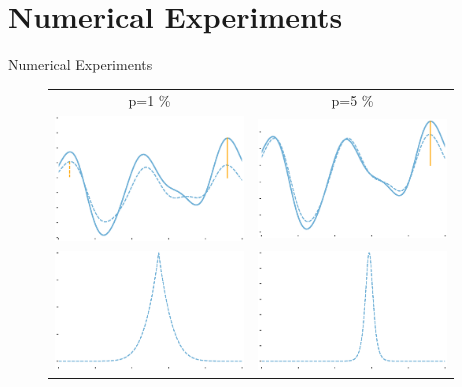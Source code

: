 \documentclass{beamer}
\begin{document}
\section{Numerical Experiments}
\begin{frame}{Numerical Experiments}
	\begin{figure}[H]
		\centering
		\begin{tabular}{cc}
			p=1 \% &p=5 \% \\
			\includegraphics[width=5cm]{c_F_a_1.eps}&
			\includegraphics[width=5cm]{c_F_a_5.eps}\\
			
			\includegraphics[width=5cm]{c_P_x_1.eps}&
			\includegraphics[width=5cm]{c_P_x_5.eps}\\

			
		\end{tabular}
	\end{figure}
\end{frame}
\end{document}
